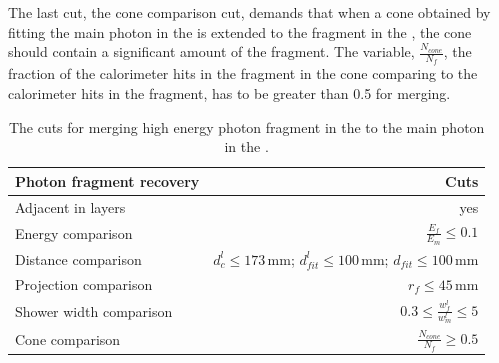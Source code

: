
The last cut, the cone comparison cut, demands that when a cone obtained by fitting the main photon in the \ECAL is extended to the fragment in the \HCAL, the cone should contain a significant amount of the fragment. The variable, $\frac{N_{cone}}{N_f}$, the fraction of the calorimeter hits in the fragment in the cone comparing to the  calorimeter hits in the fragment, has to be greater than 0.5 for merging.



\begin{table}[htbp]
\centering

\smallskip

\begin{tabular}{l r }
\hline
\hline
Photon fragment recovery&  Cuts\\
\hline
\multicolumn{1}{L{0.3\textwidth}}{Adjacent in layers} & \multicolumn{1}{R{0.6\textwidth}}{yes} \\
\multicolumn{1}{L{0.3\textwidth}}{Energy comparison} & \multicolumn{1}{R{0.6\textwidth}}{$ \frac{E_f}{E_m} \leqslant 0.1$} \\
\multicolumn{1}{L{0.3\textwidth}}{Distance comparison} & \multicolumn{1}{R{0.6\textwidth}}{$d^l_c \leqslant 173\,\text{mm}$; $d^l_{fit} \leqslant 100\,\text{mm}$; $d_{fit} \leqslant 100\,\text{mm}$} \\
\multicolumn{1}{L{0.3\textwidth}}{Projection comparison} & \multicolumn{1}{R{0.6\textwidth}}{$ r_f \leqslant 45\,\text{mm}$} \\
\multicolumn{1}{L{0.3\textwidth}}{Shower width comparison} & \multicolumn{1}{R{0.6\textwidth}}{$  0.3 \leqslant \frac{w^l_f}{w^l_m} \leqslant 5$} \\
\multicolumn{1}{L{0.3\textwidth}}{Cone comparison} & \multicolumn{1}{R{0.6\textwidth}}{$ \frac{N_{cone}}{N_f} \geqslant 0.5$} \\

\hline
\hline
\end{tabular}

\caption[Cuts for merging high energy photon fragment in the \HCAL.]%
{The cuts for merging high energy photon fragment in the \HCAL to the main photon in the \ECAL. }


\end{table}
